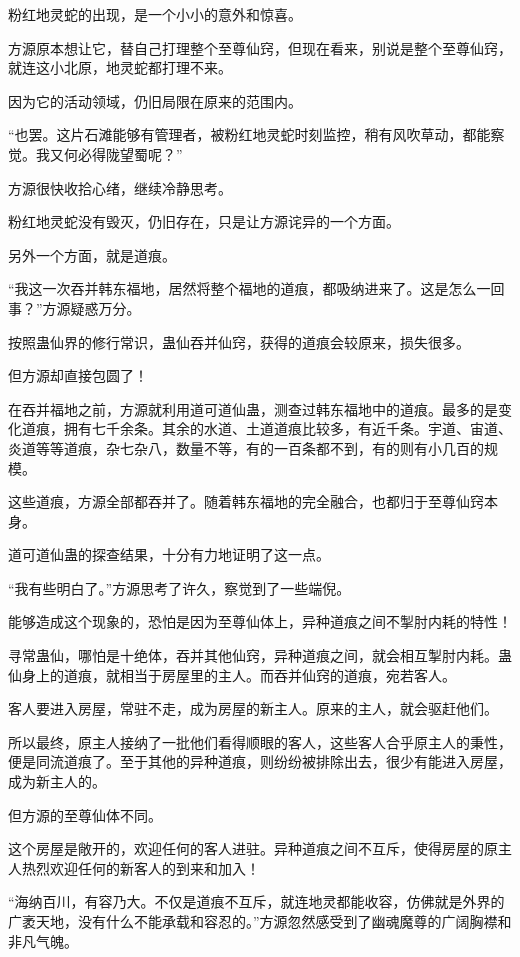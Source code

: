 \begin{this_body}
粉红地灵蛇的出现，是一个小小的意外和惊喜。

方源原本想让它，替自己打理整个至尊仙窍，但现在看来，别说是整个至尊仙窍，就连这小北原，地灵蛇都打理不来。

因为它的活动领域，仍旧局限在原来的范围内。

“也罢。这片石滩能够有管理者，被粉红地灵蛇时刻监控，稍有风吹草动，都能察觉。我又何必得陇望蜀呢？”

方源很快收拾心绪，继续冷静思考。

粉红地灵蛇没有毁灭，仍旧存在，只是让方源诧异的一个方面。

另外一个方面，就是道痕。

“我这一次吞并韩东福地，居然将整个福地的道痕，都吸纳进来了。这是怎么一回事？”方源疑惑万分。

按照蛊仙界的修行常识，蛊仙吞并仙窍，获得的道痕会较原来，损失很多。

但方源却直接包圆了！

在吞并福地之前，方源就利用道可道仙蛊，测查过韩东福地中的道痕。最多的是变化道痕，拥有七千余条。其余的水道、土道道痕比较多，有近千条。宇道、宙道、炎道等等道痕，杂七杂八，数量不等，有的一百条都不到，有的则有小几百的规模。

这些道痕，方源全部都吞并了。随着韩东福地的完全融合，也都归于至尊仙窍本身。

道可道仙蛊的探查结果，十分有力地证明了这一点。

“我有些明白了。”方源思考了许久，察觉到了一些端倪。

能够造成这个现象的，恐怕是因为至尊仙体上，异种道痕之间不掣肘内耗的特性！

寻常蛊仙，哪怕是十绝体，吞并其他仙窍，异种道痕之间，就会相互掣肘内耗。蛊仙身上的道痕，就相当于房屋里的主人。而吞并仙窍的道痕，宛若客人。

客人要进入房屋，常驻不走，成为房屋的新主人。原来的主人，就会驱赶他们。

所以最终，原主人接纳了一批他们看得顺眼的客人，这些客人合乎原主人的秉性，便是同流道痕了。至于其他的异种道痕，则纷纷被排除出去，很少有能进入房屋，成为新主人的。

但方源的至尊仙体不同。

这个房屋是敞开的，欢迎任何的客人进驻。异种道痕之间不互斥，使得房屋的原主人热烈欢迎任何的新客人的到来和加入！

“海纳百川，有容乃大。不仅是道痕不互斥，就连地灵都能收容，仿佛就是外界的广袤天地，没有什么不能承载和容忍的。”方源忽然感受到了幽魂魔尊的广阔胸襟和非凡气魄。


\end{this_body}
